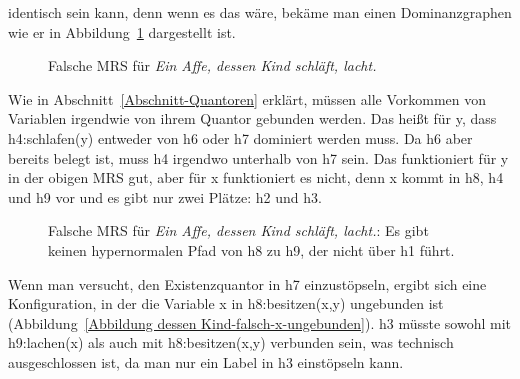 identisch sein kann, denn wenn es das wäre, bekäme man einen Dominanzgraphen wie er in Abbildung~\ref{Abbildung dessen Kind-falsch}
dargestellt ist.
\begin{figure}

\caption{Falsche MRS für \emph{Ein Affe, dessen Kind schläft, lacht.}}\label{Abbildung dessen Kind-falsch}
\end{figure}

Wie in Abschnitt~\ref{Abschnitt-Quantoren} erklärt, müssen alle Vorkommen von Variablen irgendwie von
ihrem Quantor gebunden werden. Das heißt für y, dass h4:schlafen(y) entweder von h6 oder h7 dominiert
werden muss. Da h6 aber bereits belegt ist, muss h4 irgendwo unterhalb von h7 sein. Das funktioniert
für y in der obigen MRS gut, aber für x funktioniert es nicht, denn x kommt in h8, h4 und h9 vor und
es gibt nur zwei Plätze: h2 und h3.
\begin{figure}
\caption{Falsche MRS für \emph{Ein Affe, dessen Kind schläft, lacht.}: Es gibt keinen hypernormalen
  Pfad von h8 zu h9, der nicht über h1 führt.}\label{Abbildung dessen Kind-falsche-MRS}
\end{figure}
Wenn man versucht, den Existenzquantor in h7 einzustöpseln, ergibt sich eine Konfiguration, in der
die Variable x in h8:besitzen(x,y) ungebunden ist (Abbildung~\ref{Abbildung dessen Kind-falsch-x-ungebunden}). h3 müsste sowohl mit h9:lachen(x) als auch mit
h8:besitzen(x,y) verbunden sein, was technisch ausgeschlossen ist, da man nur ein Label in h3
einstöpseln kann.

